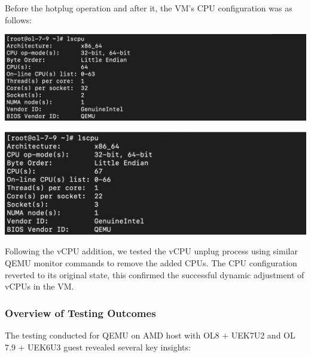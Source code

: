 Before the hotplug operation and after it, the VM’s CPU configuration was as follows:

\begin{center}
    \centering
    \includegraphics[width=\textwidth]{Images/lscpu before hotplug.png}
    \label{fig}
\end{center}

\begin{center}
    \centering
    \includegraphics[width=\textwidth]{Images/lscpu after hotplug.png}
    \label{fig}
\end{center}

Following the vCPU addition, we tested the vCPU unplug process using similar QEMU monitor commands to remove the added CPUs. The CPU configuration reverted to its original state, this confirmed the successful dynamic adjustment of vCPUs in the VM.

\subsubsection[Overview of Testing Outcomes]{Overview of Testing Outcomes}
The testing conducted for QEMU on AMD host with OL8 + UEK7U2 and OL 7.9 + UEK6U3 guest revealed several key insights:


